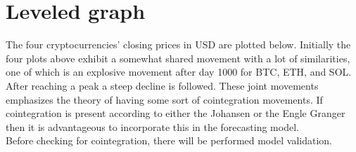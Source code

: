 \section{Leveled graph}
The four cryptocurrencies' closing prices in USD are plotted below.
\noindent Initially the four plots above exhibit a somewhat shared movement with a lot of similarities, one of which is an explosive movement after day 1000 for BTC, ETH, and SOL. After reaching a peak a steep decline is followed. These joint movements emphasizes the theory of having some sort of cointegration movements. If cointegration is present according to either the Johansen or the Engle Granger then it is advantageous to incorporate this in the forecasting model.\\
Before checking for cointegration, there will be performed model validation.



